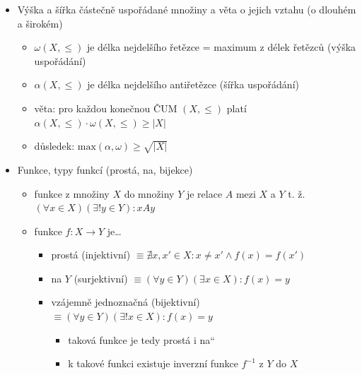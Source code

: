 \begin{itemize}
\begin{itemize}
\begin{itemize}
\end{itemize}
\item věta: konečná neprázdná uspořádaná množina má minimální a maximální prvek
\item pro $(X,\leq)$ ČUM:
\begin{itemize}
\item $A\subseteq X$ je řetězec $\equiv \forall a,b \in A: a,b$ jsou porovnatelné
\item $A \subseteq X$ je antiřetězec (nezávislá množina) $\equiv \nexists a,b$ různé \& porovnatelné
\end{itemize}
\end{itemize}
\item Výška a šířka částečně uspořádané množiny a věta o jejich vztahu (o dlouhém a širokém)
\begin{itemize}
\item $\omega(X,\leq)$ je délka nejdelšího řetězce = maximum z délek řetězců (výška uspořádání)
\item $\alpha(X,\leq)$ je délka nejdelšího antiřetězce (šířka uspořádání)
\item věta: pro každou konečnou ČUM $(X,\leq)$ platí $\alpha(X,\leq)\cdot \omega(X,\leq)\geq |X|$
\item důsledek: $\text{max}(\alpha,\omega)\geq\sqrt{|X|}$
\end{itemize}
\item Funkce, typy funkcí (prostá, na, bijekce)
\begin{itemize}
\item funkce z množiny $X$ do množiny $Y$ je relace $A$ mezi $X$ a $Y$ t. ž. $(\forall x\in X)(\exists! y\in Y):xAy$
\item funkce $f:X\to Y$ je\dots{}
\begin{itemize}
\item prostá (injektivní) $\equiv \nexists x,x' \in X: x \neq x' \land f(x)=f(x')$
\item na $Y$ (surjektivní) $\equiv (\forall y \in Y)(\exists x \in X): f(x)=y$
\item vzájemně jednoznačná (bijektivní) $\equiv (\forall y \in Y)(\exists! x \in X):f(x)=y$
\begin{itemize}
\item taková funkce je tedy prostá i \quotedblbase{}na\textquotedblleft{}
\item k takové funkci existuje inverzní funkce $f^{-1}$ z $Y$ do $X$
\end{itemize}
\end{itemize}
\end{itemize}

\end{itemize}
